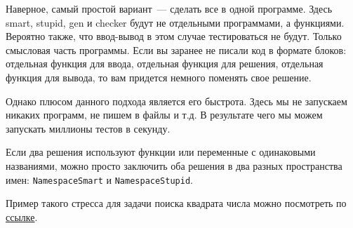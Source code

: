 Наверное, самый простой вариант~--- сделать все в одной программе. Здесь smart, stupid, gen и checker будут не отдельными программами, а функциями. Вероятно также, что ввод-вывод в этом случае тестироваться не будут. Только смысловая часть программы. Если вы заранее не писали код в формате блоков: отдельная функция для ввода, отдельная функция для решения, отдельная функция для вывода, то вам придется немного поменять свое решение.

Однако плюсом данного подхода является его быстрота. Здесь мы не запускаем никаких программ, не пишем в файлы и т.д. В результате чего мы можем запускать миллионы тестов в секунду.

Если два решения используют функции или переменные с одинаковыми названиями, можно просто заключить оба решения в два разных пространства имен: \verb+NamespaceSmart+ и \verb+NamespaceStupid+.

Пример такого стресса для задачи поиска квадрата числа можно посмотреть по \href{https://pastebin.com/HqQkPNVG}{ссылке}.
